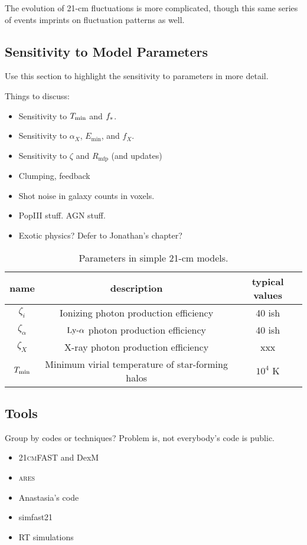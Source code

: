 The evolution of 21-cm fluctuations is more complicated, though this same series of events imprints on fluctuation patterns as well. 


\subsection{Sensitivity to Model Parameters}
Use this section to highlight the sensitivity to parameters in more detail.


Things to discuss:
\begin{itemize}
	\item Sensitivity to $T_{\min}$ and $f_{\ast}$.
	\item Sensitivity to $\alpha_X$, $E_{\min}$, and $f_X$.
	\item Sensitivity to $\zeta$ and $R_{\mathrm{mfp}}$ (and updates)
	\item Clumping, feedback
	\item Shot noise in galaxy counts in voxels.
	\item PopIII stuff. AGN stuff.
	\item Exotic physics? Defer to Jonathan's chapter?
\end{itemize}

\begin{center}
\begin{table}
\begin{tabular}{||c | c | c||}
\hline
name & description & typical values \\ 
\hline\hline
$\zeta_i$ & Ionizing photon production efficiency & 40 ish  \\ 
\hline
$\zeta_{\alpha}$ & $\text{Ly-}\alpha$ photon production efficiency & 40 ish  \\ 
\hline
$\zeta_X$ & X-ray photon production efficiency & xxx \\
\hline
$T_{\min}$ & Minimum virial temperature of star-forming halos & $10^4$ K \\
\hline
\end{tabular}
\caption{Parameters in simple 21-cm models.}
\end{table}
\end{center}



\subsection{Tools}
Group by codes or techniques? Problem is, not everybody's code is public.
\begin{itemize}
	\item \textsc{21cmFAST} and DexM
	\item \textsc{ares}
	\item Anastasia's code
	\item simfast21
	\item RT simulations
\end{itemize}






